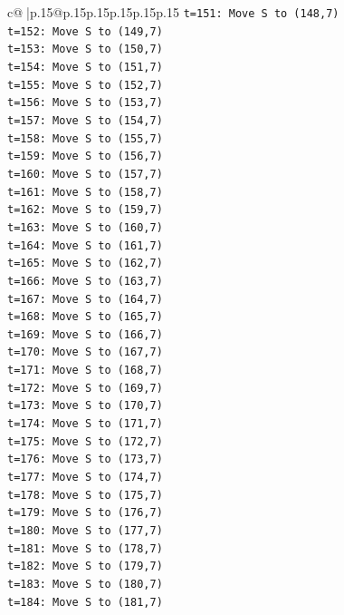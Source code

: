 \documentclass{article}
\begin{document}
{\begin{supertabular}{c@{$\;$}|p{.15\linewidth}@{}p{.15\linewidth}p{.15\linewidth}p{.15\linewidth}p{.15\linewidth}p{.15\linewidth}}
{{{\texttt{t=151: Move S to (148,7)} \\
\texttt{t=152: Move S to (149,7)} \\
\texttt{t=153: Move S to (150,7)} \\
\texttt{t=154: Move S to (151,7)} \\
\texttt{t=155: Move S to (152,7)} \\
\texttt{t=156: Move S to (153,7)} \\
\texttt{t=157: Move S to (154,7)} \\
\texttt{t=158: Move S to (155,7)} \\
\texttt{t=159: Move S to (156,7)} \\
\texttt{t=160: Move S to (157,7)} \\
\texttt{t=161: Move S to (158,7)} \\
\texttt{t=162: Move S to (159,7)} \\
\texttt{t=163: Move S to (160,7)} \\
\texttt{t=164: Move S to (161,7)} \\
\texttt{t=165: Move S to (162,7)} \\
\texttt{t=166: Move S to (163,7)} \\
\texttt{t=167: Move S to (164,7)} \\
\texttt{t=168: Move S to (165,7)} \\
\texttt{t=169: Move S to (166,7)} \\
\texttt{t=170: Move S to (167,7)} \\
\texttt{t=171: Move S to (168,7)} \\
\texttt{t=172: Move S to (169,7)} \\
\texttt{t=173: Move S to (170,7)} \\
\texttt{t=174: Move S to (171,7)} \\
\texttt{t=175: Move S to (172,7)} \\
\texttt{t=176: Move S to (173,7)} \\
\texttt{t=177: Move S to (174,7)} \\
\texttt{t=178: Move S to (175,7)} \\
\texttt{t=179: Move S to (176,7)} \\
\texttt{t=180: Move S to (177,7)} \\
\texttt{t=181: Move S to (178,7)} \\
\texttt{t=182: Move S to (179,7)} \\
\texttt{t=183: Move S to (180,7)} \\
\texttt{t=184: Move S to (181,7)} \\
}}}
\end{supertabular}}
\end{document}
